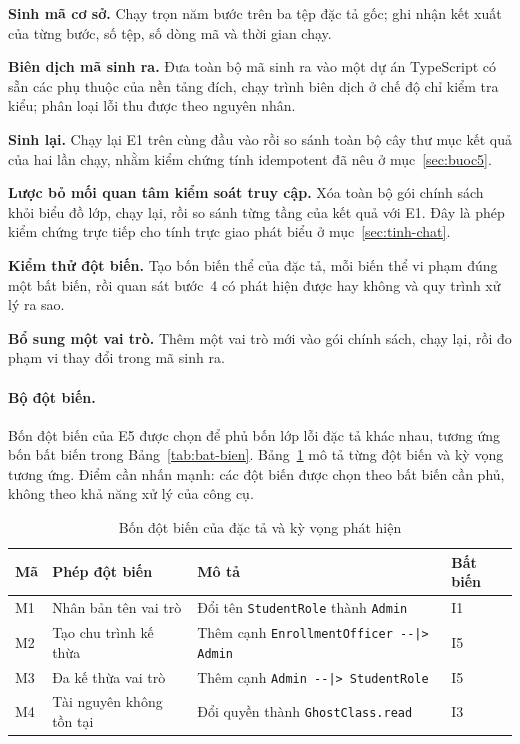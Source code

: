 \begin{description}[leftmargin=3.2em,style=sameline,itemsep=3pt]
  \item[E1.] \textbf{Sinh mã cơ sở.} Chạy trọn năm bước trên ba tệp đặc tả gốc; ghi nhận kết xuất của từng bước, số tệp, số dòng mã và thời gian chạy.
  \item[E2.] \textbf{Biên dịch mã sinh ra.} Đưa toàn bộ mã sinh ra vào một dự án TypeScript có sẵn các phụ thuộc của nền tảng đích, chạy trình biên dịch ở chế độ chỉ kiểm tra kiểu; phân loại lỗi thu được theo nguyên nhân.
  \item[E3.] \textbf{Sinh lại.} Chạy lại E1 trên cùng đầu vào rồi so sánh toàn bộ cây thư mục kết quả của hai lần chạy, nhằm kiểm chứng tính idempotent đã nêu ở mục~\ref{sec:buoc5}.
  \item[E4.] \textbf{Lược bỏ mối quan tâm kiểm soát truy cập.} Xóa toàn bộ gói chính sách khỏi biểu đồ lớp, chạy lại, rồi so sánh từng tầng của kết quả với E1. Đây là phép kiểm chứng trực tiếp cho tính trực giao phát biểu ở mục~\ref{sec:tinh-chat}.
  \item[E5.] \textbf{Kiểm thử đột biến.} Tạo bốn biến thể của đặc tả, mỗi biến thể vi phạm đúng một bất biến, rồi quan sát bước~4 có phát hiện được hay không và quy trình xử lý ra sao.
  \item[E6.] \textbf{Bổ sung một vai trò.} Thêm một vai trò mới vào gói chính sách, chạy lại, rồi đo phạm vi thay đổi trong mã sinh ra.
\end{description}

\paragraph{Bộ đột biến.}
Bốn đột biến của E5 được chọn để phủ bốn lớp lỗi đặc tả khác nhau, tương ứng bốn bất biến trong Bảng~\ref{tab:bat-bien}. Bảng~\ref{tab:dot-bien} mô tả từng đột biến và kỳ vọng tương ứng. Điểm cần nhấn mạnh: các đột biến được chọn theo bất biến cần phủ, không theo khả năng xử lý của công cụ.

\begin{table}[htbp]
\centering
\caption{Bốn đột biến của đặc tả và kỳ vọng phát hiện}
\label{tab:dot-bien}
\small
\begin{tabularx}{\textwidth}{@{}llXl@{}}
\toprule
\textbf{Mã} & \textbf{Phép đột biến} & \textbf{Mô tả} & \textbf{Bất biến} \\
\midrule
M1 & Nhân bản tên vai trò & Đổi tên \texttt{StudentRole} thành \texttt{Admin} & I1 \\
M2 & Tạo chu trình kế thừa & Thêm cạnh \texttt{EnrollmentOfficer -{}-|> Admin} & I5 \\
M3 & Đa kế thừa vai trò & Thêm cạnh \texttt{Admin -{}-|> StudentRole} & I5 \\
M4 & Tài nguyên không tồn tại & Đổi quyền thành \texttt{GhostClass.read} & I3 \\
\bottomrule
\end{tabularx}
\end{table}

